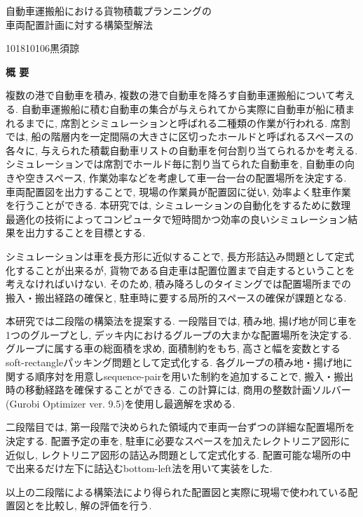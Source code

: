 \begin{center}
{\LARGE 自動車運搬船における貨物積載プランニングの\\車両配置計画に対する構築型解法}\\[0.5cm]
\end{center}
\hfill
{\large 101810106\qquad 黒須諒}\\[0.5cm]
\begin{center}
{\Large \bf 概 要}\\
\end{center}

複数の港で自動車を積み, 複数の港で自動車を降ろす自動車運搬船について考える. 
自動車運搬船に積む自動車の集合が与えられてから実際に自動車が船に積まれるまでに, 席割とシミュレーションと呼ばれる二種類の作業が行われる. 
席割では, 船の階層内を一定間隔の大きさに区切ったホールドと呼ばれるスペースの各々に, 与えられた積載自動車リストの自動車を何台割り当てられるかを考える. 
シミュレーションでは席割でホールド毎に割り当てられた自動車を, 自動車の向きや空きスペース, 作業効率などを考慮して車一台一台の配置場所を決定する. 
車両配置図を出力することで, 現場の作業員が配置図に従い, 効率よく駐車作業を行うことができる. 
本研究では, シミュレーションの自動化をするために数理最適化の技術によってコンピュータで短時間かつ効率の良いシミュレーション結果を出力することを目標とする. 

シミュレーションは車を長方形に近似することで, 長方形詰込み問題として定式化することが出来るが, 貨物である自走車は配置位置まで自走するということを考えなければいけない. 
そのため, 積み降ろしのタイミングでは配置場所までの搬入・搬出経路の確保と, 駐車時に要する局所的スペースの確保が課題となる. 

本研究では二段階の構築法を提案する. 
一段階目では, 積み地, 揚げ地が同じ車を1つのグループとし, デッキ内におけるグループの大まかな配置場所を決定する. 
グループに属する車の総面積を求め, 面積制約をもち, 高さと幅を変数とするsoft-rectangleパッキング問題として定式化する. 
各グループの積み地・揚げ地に関する順序対を用意しsequence-pairを用いた制約を追加することで, 搬入・搬出時の移動経路を確保することができる. 
この計算には, 商用の整数計画ソルバー(Gurobi Optimizer ver. 9.5)を使用し最適解を求める. 

二段階目では, 第一段階で決められた領域内で車両一台ずつの詳細な配置場所を決定する. 
配置予定の車を, 駐車に必要なスペースを加えたレクトリニア図形に近似し, レクトリニア図形の詰込み問題として定式化する. 
配置可能な場所の中で出来るだけ左下に詰込むbottom-left法を用いて実装をした. 

以上の二段階による構築法により得られた配置図と実際に現場で使われている配置図とを比較し, 解の評価を行う. 
